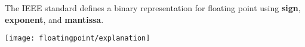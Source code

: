 \begin{blocksection}
The IEEE standard defines a binary representation for floating point using \textbf{sign}, \textbf{exponent}, and \textbf{mantissa}.

\texttt{[image: floatingpoint/explanation]}

\end{blocksection}